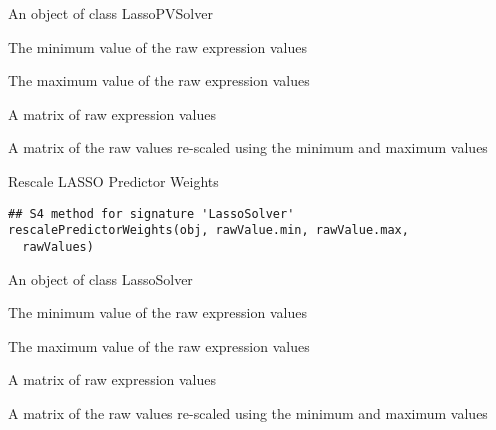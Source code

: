 \documentclass[a4paper]{book}
\begin{document}
%
\begin{Arguments}
\begin{ldescription}
\item[\code{obj}] An object of class LassoPVSolver

\item[\code{rawValue.min}] The minimum value of the raw expression values

\item[\code{rawValue.max}] The maximum value of the raw expression values

\item[\code{rawValues}] A matrix of raw expression values
\end{ldescription}
\end{Arguments}
%
\begin{Value}
A matrix of the raw values re-scaled using the minimum and maximum values
\end{Value}
%
\begin{Description}\relax
Rescale LASSO Predictor Weights
\end{Description}
%
\begin{Usage}
\begin{verbatim}
## S4 method for signature 'LassoSolver'
rescalePredictorWeights(obj, rawValue.min, rawValue.max,
  rawValues)
\end{verbatim}
\end{Usage}
%
\begin{Arguments}
\begin{ldescription}
\item[\code{obj}] An object of class LassoSolver

\item[\code{rawValue.min}] The minimum value of the raw expression values

\item[\code{rawValue.max}] The maximum value of the raw expression values

\item[\code{rawValues}] A matrix of raw expression values
\end{ldescription}
\end{Arguments}
%
\begin{Value}
A matrix of the raw values re-scaled using the minimum and maximum values
\end{Value}
\end{document}
